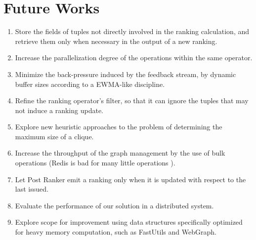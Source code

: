 \section{Future Works}
\label{sec:future-works}

\begin{enumerate}
	\item Store the fields of tuples not directly involved in the ranking calculation, and retrieve them only when necessary in the output of a new ranking.
	
	\item Increase the parallelization degree of the operations within the same operator.
	
	\item Minimize the back-pressure induced by the feedback stream, by dynamic buffer sizes according to a EWMA-like discipline.
	
	\item Refine the ranking operator's filter, so that it can ignore the tuples that may not induce a ranking update.
	
	\item Explore new heuristic approaches to the problem of determining the maximum size of a clique.
	
	\item Increase the throughput of the graph management by the use of bulk operations (Redis is bad for many little operations \cite{ZhangTudorChenOoi2014}).
	
	\item Let Post Ranker emit a ranking only when it is updated with respect to the last issued.
	
	\item Evaluate the performance of our solution in a distributed system.
	
	\item Explore scope for improvement using data structures specifically optimized for heavy memory computation, such as FastUtils\cite{FastUtil} and WebGraph\cite{WebGraph}.
	
\end{enumerate}


